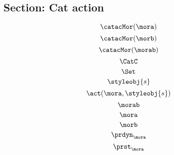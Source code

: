 {\begin{forslides}
        \subsection{Section: Cat action}

        \begin{equation}
            \label{eq:cat-mora}
            \catacMor(\mora)
        \end{equation}
        \begin{equation}
            \label{eq:cat-morb}
            \catacMor(\morb)
        \end{equation}
        \begin{equation}
            \label{eq:cat-morab}
            \catacMor(\morab)
        \end{equation}
        \begin{equation}
            \label{eq:catC}
            \CatC
        \end{equation}
        \begin{equation}
            \label{eq:sets}
            \Set
        \end{equation}
        \begin{equation}
            \label{eq:signal}
            \styleobj{s}
        \end{equation}
        \begin{equation}
            \label{eq:signal-apply}
            \act(\mora, \styleobj{s})
        \end{equation}
        \begin{equation}
            \label{eq:morab}
            \morab
        \end{equation}
        \begin{equation}
            \label{eq:mora}
            \mora
        \end{equation}
        \begin{equation}
            \label{eq:morb}
            \morb
        \end{equation}
        \begin{equation}
            \label{eq:mora-prdyn}
            \prdyn_{\mora}
        \end{equation}
        \begin{equation}
            \label{eq:mora-prst}
            \prst_{\mora}
        \end{equation}
        \begin{equation}
            \label{eq:mora-prin}

\end{equation}
\end{forslides}}
